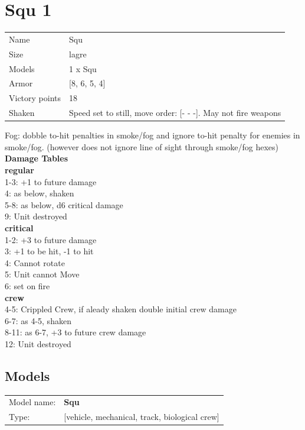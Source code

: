 \clearpage

\section{ Squ 1 }

\begin{tabular}{ll}
  Name & Squ \\
  Size & lagre\\
  Models & 1 x Squ\\
  Armor & [8, 6, 5, 4]\\
  Victory points & 18\\
  Shaken & Speed set to still, move order: [- - -]. May not fire weapons\\
\end{tabular}

Fog: dobble to-hit penalties in smoke/fog and ignore to-hit penalty for enemies in smoke/fog. (however does not ignore line of sight through smoke/fog hexes)\\ 



{\bf Damage Tables} \\
 {\bf regular } \\
1-3: +1 to future damage \\
4: as below, shaken \\
5-8: as below, d6 critical damage \\
9: Unit destroyed \\
 {\bf critical } \\
1-2: +3 to future damage \\
3: +1 to be hit, -1 to hit \\
4: Cannot rotate \\
5: Unit cannot Move  \\
6: set on fire \\
 {\bf crew } \\
4-5: Crippled Crew, if aleady shaken double initial crew damage \\
6-7: as 4-5, shaken \\
8-11: as 6-7, +3 to future crew damage \\
12: Unit destroyed \\


\clearpage

\subsection{ Models }

\begin{tabular}{ll}
Model name: & {\bf Squ } \\
Type: & [vehicle, mechanical, track, biological crew] \\
\end{tabular}


